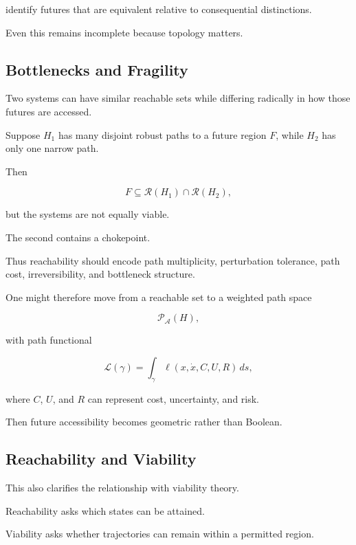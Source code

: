\documentclass[11pt]{article}
\theoremstyle{remark}
\newcommand{\Adm}{\mathcal{A}}
\newcommand{\Reach}{\mathcal{R}}
\begin{document}
identify futures that are equivalent relative to consequential distinctions.

Even this remains incomplete because topology matters.

\subsection{Bottlenecks and Fragility}

Two systems can have similar reachable sets while differing radically in how those futures are accessed.

Suppose $H_1$ has many disjoint robust paths to a future region $F$, while $H_2$ has only one narrow path.

Then

\begin{equation}
F\subseteq\Reach(H_1)
\cap
\Reach(H_2),
\end{equation}

but the systems are not equally viable.

The second contains a chokepoint.

Thus reachability should encode path multiplicity, perturbation tolerance, path cost, irreversibility, and bottleneck structure.

One might therefore move from a reachable set to a weighted path space

\begin{equation}
\mathcal{P}_{\Adm}(H),
\end{equation}

with path functional

\begin{equation}
\mathcal{L}(\gamma)
=
\int_\gamma
\ell
(
x,\dot{x},C,U,R
)
\,ds,
\end{equation}

where $C$, $U$, and $R$ can represent cost, uncertainty, and risk.

Then future accessibility becomes geometric rather than Boolean.

\subsection{Reachability and Viability}

This also clarifies the relationship with viability theory.

Reachability asks which states can be attained.

Viability asks whether trajectories can remain within a permitted region.
\end{document}
